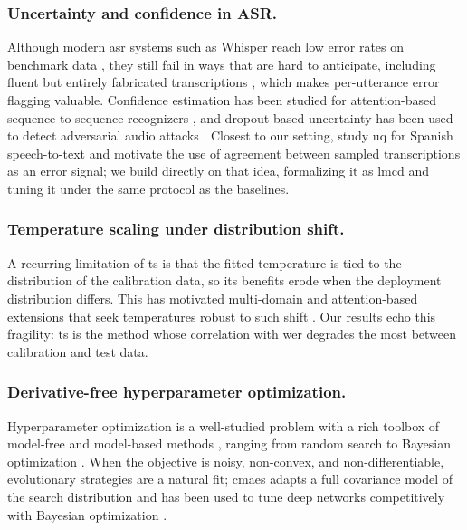 \documentclass[runningheads]{llncs}
\begin{document}
\subsubsection{Uncertainty and confidence in ASR.}
Although modern \acrshort{asr} systems such as Whisper \cite{radford2023robust} reach low error rates on benchmark data \cite{srivastav2025open}, they still fail in ways that are hard to anticipate, including fluent but entirely fabricated transcriptions \cite{koenecke2024careless}, which makes per-utterance error flagging valuable. Confidence estimation has been studied for attention-based sequence-to-sequence recognizers \cite{li2021confidence}, and dropout-based uncertainty has been used to detect adversarial audio attacks \cite{jayashankar2020detecting}. Closest to our setting, \cite{rodriguez2024uncertainty} study \acrshort{uq} for Spanish speech-to-text and motivate the use of agreement between sampled transcriptions as an error signal; we build directly on that idea, formalizing it as \acrshort{lmcd} and tuning it under the same protocol as the baselines.

\subsubsection{Temperature scaling under distribution shift.}
A recurring limitation of \acrshort{ts} is that the fitted temperature is tied to the distribution of the calibration data, so its benefits erode when the deployment distribution differs. This has motivated multi-domain and attention-based extensions that seek temperatures robust to such shift \cite{yu2022robust,mozafari2018attended}. Our results echo this fragility: \acrshort{ts} is the method whose correlation with \acrshort{wer} degrades the most between calibration and test data.

\subsubsection{Derivative-free hyperparameter optimization.}
Hyperparameter optimization is a well-studied problem with a rich toolbox of model-free and model-based methods \cite{Feurer2019}, ranging from random search \cite{bergstra2012random} to Bayesian optimization \cite{snoek2012practical}. When the objective is noisy, non-convex, and non-differentiable, evolutionary strategies are a natural fit; \acrfull{cmaes} \cite{hansen2001completely} adapts a full covariance model of the search distribution and has been used to tune deep networks competitively with Bayesian optimization \cite{loshchilov2016cma}.
\end{document}
